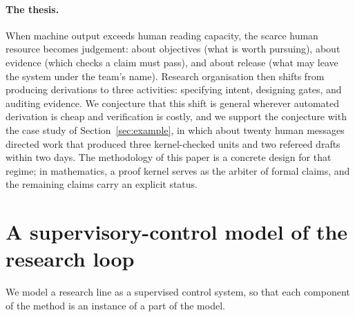\documentclass[11pt]{article}
\begin{document}
\paragraph{The thesis.} When machine output exceeds human reading capacity,
the scarce human resource becomes judgement: about objectives (what is worth
pursuing), about evidence (which checks a claim must pass), and about release
(what may leave the system under the team's name). Research organisation then
shifts from producing derivations to three activities: specifying intent,
designing gates, and auditing evidence. We conjecture that this shift is
general wherever automated derivation is cheap and verification is costly,
and we support the conjecture with the case study of
Section~\ref{sec:example}, in which about twenty human messages directed work
that produced three kernel-checked units and two refereed drafts within two
days. The methodology of this paper is a concrete design for that regime; in
mathematics, a proof kernel serves as the arbiter of formal claims, and the
remaining claims carry an explicit status.

\section{A supervisory-control model of the research loop}
\label{sec:model}
We model a research line as a supervised control system, so that each
component of the method is an instance of a part of the model.
\end{document}
